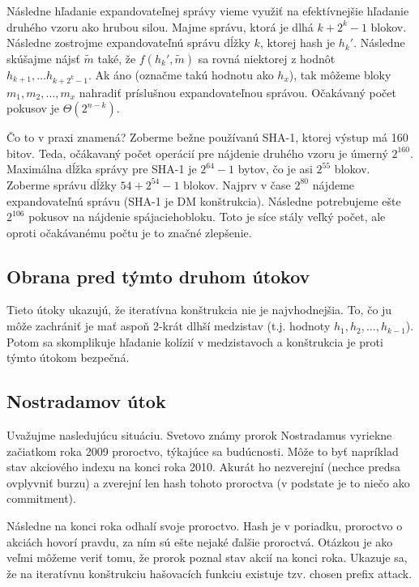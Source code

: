 Následne hľadanie expandovateľnej správy vieme využiť na efektívnejšie hľadanie druhého vzoru ako hrubou silou.
Majme správu, ktorá je dlhá $k + 2^k - 1$ blokov. Následne zostrojme expandovateľnú správu dĺžky $k$, ktorej hash je $h_k'$.
Následne skúšajme nájsť  $\tilde{m}$ také, že $f(h_k', \tilde{m})$ sa rovná niektorej z hodnôt $h_{k+1}, \dots h_{k+2^k-1}$. Ak áno 
(označme takú hodnotu ako $h_x$), tak môžeme bloky $m_1, m_2, \dots, m_x$ nahradiť príslušnou expandovateľnou správou.
Očakávaný počet pokusov je $\Theta(2^{n-k})$. 

Čo to v praxi znamená? Zoberme bežne používanú SHA-1, ktorej výstup má 160 bitov. Teda,
očákavaný počet operácií pre nájdenie druhého vzoru je úmerný $2^{160}$. Maximálna dĺžka správy
pre SHA-1 je $2^{64} - 1$ bytov, čo je asi $2^{55}$ blokov. Zoberme správu dĺžky
$54 + 2^{54} - 1$ blokov. Najprv v čase $2^{80}$ nájdeme expandovateľnú správu (SHA-1 je DM konštrukcia).
Následne potrebujeme ešte $2^{106}$ pokusov na nájdenie \clqq spájacieho\crqq bloku.
Toto je síce stály veľký počet, ale oproti očakávanému počtu je to značné zlepšenie.

\subsection{Obrana pred týmto druhom útokov}
Tieto útoky ukazujú, že iteratívna konštrukcia nie je najvhodnejšia.
To, čo ju môže zachrániť je mať aspoň 2-krát dlhší medzistav 
(t.j. hodnoty $h_1, h_2, \dots, h_{k-1}$). Potom sa skomplikuje hľadanie
kolízií v medzistavoch a konštrukcia je proti týmto útokom bezpečná.

\subsection{Nostradamov útok}

Uvažujme nasledujúcu situáciu. Svetovo známy prorok Nostradamus
vyriekne začiatkom roka 2009 proroctvo, týkajúce sa budúcnosti.
Môže to byť napríklad stav akciového indexu na konci roka 2010.
Akurát ho nezverejní (nechce predsa ovplyvniť burzu) a zverejní
len hash tohoto proroctva (v podstate je to niečo ako commitment).

Následne na konci roka odhalí svoje proroctvo. Hash je v poriadku, proroctvo
o akciách hovorí pravdu, za ním sú ešte nejaké ďalšie proroctvá.
Otázkou je ako veľmi môžeme veriť tomu, že prorok poznal stav
akcií na konci roka. Ukazuje sa, že na iteratívnu konštrukciu
hašovacích funkciu existuje tzv. chosen prefix attack.

